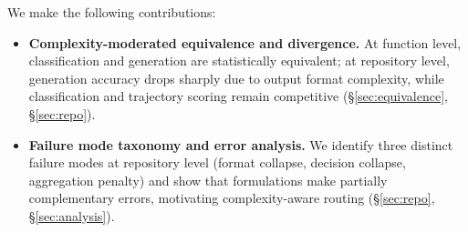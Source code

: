 We make the following contributions:

\begin{itemize}[leftmargin=*,itemsep=2pt]
\item \textbf{Complexity-moderated equivalence and divergence.} At function level, classification and generation are statistically equivalent; at repository level, generation accuracy drops sharply due to output format complexity, while classification and trajectory scoring remain competitive (\S\ref{sec:equivalence}, \S\ref{sec:repo}).

\item \textbf{Failure mode taxonomy and error analysis.} We identify three distinct failure modes at repository level (format collapse, decision collapse, aggregation penalty) and show that formulations make partially complementary errors, motivating complexity-aware routing (\S\ref{sec:repo}, \S\ref{sec:analysis}).
\end{itemize}
